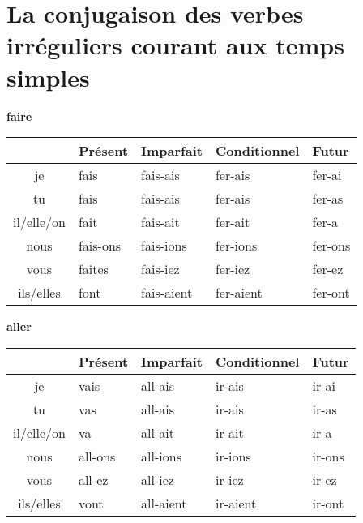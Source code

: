 \clearpage
\section{La conjugaison des verbes irr\'eguliers courant aux temps simples}
\setcounter{theorem}{0}
\setcounter{equation}{0}

\renewcommand{\stemPresent}{fais}
\renewcommand{\stemFutur}{fer}
\begin{center}
\textbf{faire}
\vskip 0.1cm
\begin{tabular}{|c||L{3cm}|L{3cm}|L{3cm}|L{3cm}|}
\hline
& Pr\'esent & Imparfait & Conditionnel & Futur \\
\hline\hline
je           &	fais 	&	\stemPresent-ais	&	\stemFutur-ais	 &	\stemFutur-ai	\\
tu           &	fais	&	\stemPresent-ais	&	\stemFutur-ais	&	\stemFutur-as	\\
il/elle/on &	fait		&	\stemPresent-ait	&	\stemFutur-ait	&	\stemFutur-a	\\
nous      &	\stemPresent-ons	&	\stemPresent-ions	&	\stemFutur-ions	&	\stemFutur-ons	\\
vous      &	{\color{red}faites}	&	\stemPresent-iez	&	\stemFutur-iez		&	\stemFutur-ez	\\
ils/elles  &	font	&	\stemPresent-aient	&	\stemFutur-aient	&	\stemFutur-ont	\\
\hline
\end{tabular}
\end{center}

\renewcommand{\stemPresent}{all}
\renewcommand{\stemFutur}{ir}
\begin{center}
\textbf{aller}
\vskip 0.1cm
\begin{tabular}{|c||L{3cm}|L{3cm}|L{3cm}|L{3cm}|}
\hline
& Pr\'esent & Imparfait & Conditionnel & Futur \\
\hline\hline
je           &	vais 	&	\stemPresent-ais	&	\stemFutur-ais	 &	\stemFutur-ai	\\
tu           &	vas	&	\stemPresent-ais	&	\stemFutur-ais	&	\stemFutur-as	\\
il/elle/on &	va		&	\stemPresent-ait	&	\stemFutur-ait	&	\stemFutur-a	\\
nous      &	\stemPresent-ons	&	\stemPresent-ions	&	\stemFutur-ions	&	\stemFutur-ons	\\
vous      &	\stemPresent-ez	&	\stemPresent-iez	&	\stemFutur-iez		&	\stemFutur-ez	\\
ils/elles  &	vont	&	\stemPresent-aient	&	\stemFutur-aient	&	\stemFutur-ont	\\
\hline
\end{tabular}
\end{center}

